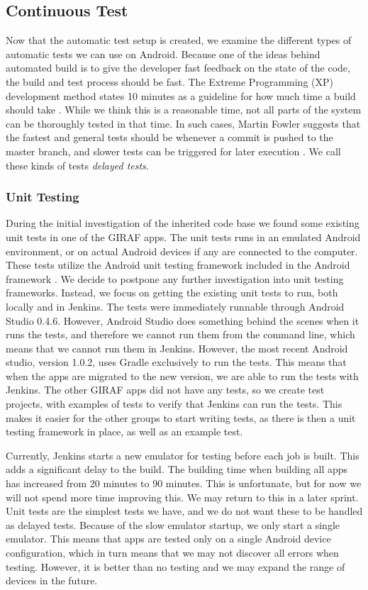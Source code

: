 \subsection{Continuous Test}
\label{sec:test_automation}
Now that the automatic test setup is created, we examine the different types of automatic tests we can use on Android. Because one of the ideas behind automated build is to give the developer fast feedback on the state of the code, the build and test process should be fast. The Extreme Programming (XP) development method states 10 minutes as a guideline for how much time a build should take \parencite{beck2004}. While we think this is a reasonable time, not all parts of the system can be thoroughly tested in that time. In such cases, Martin Fowler suggests that the fastest and general tests should be whenever a commit is pushed to the master branch, and slower tests can be triggered for later execution \parencite{fowlerCI}. We call these kinds of tests \emph{delayed tests}.

\subsubsection{Unit Testing}
During the initial investigation of the inherited code base we found some existing unit tests in one of the GIRAF apps. The unit tests runs in an emulated Android environment, or on actual Android devices if any are connected to the computer. These tests utilize the Android unit testing framework included in the Android framework \parencite{AndroidUnit}. We decide to postpone any further investigation into unit testing frameworks. Instead, we focus on getting the existing unit tests to run, both locally and in Jenkins. The tests were immediately runnable through Android Studio 0.4.6. However, Android Studio does something behind the scenes when it runs the tests, and therefore we cannot run them from the command line, which means that we cannot run them in Jenkins. However, the most recent Android studio, version 1.0.2, uses Gradle exclusively to run the tests. This means that when the apps are migrated to the new version, we are able to run the tests with Jenkins. The other GIRAF apps did not have any tests, so we create test projects, with examples of tests to verify that Jenkins can run the tests. This makes it easier for the other groups to start writing tests, as there is then a unit testing framework in place, as well as an example test.

Currently, Jenkins starts a new emulator for testing before each job is built. This adds a significant delay to the build. The building time when building all apps has increased from 20 minutes to 90 minutes. This is unfortunate, but for now we will not spend more time improving this. We may return to this in a later sprint. Unit tests are the simplest tests we have, and we do not want these to be handled as delayed tests. Because of the slow emulator startup, we only start a single emulator. This means that apps are tested only on a single Android device configuration, which in turn means that we may not discover all errors when testing. However, it is better than no testing and we may expand the range of devices in the future.

